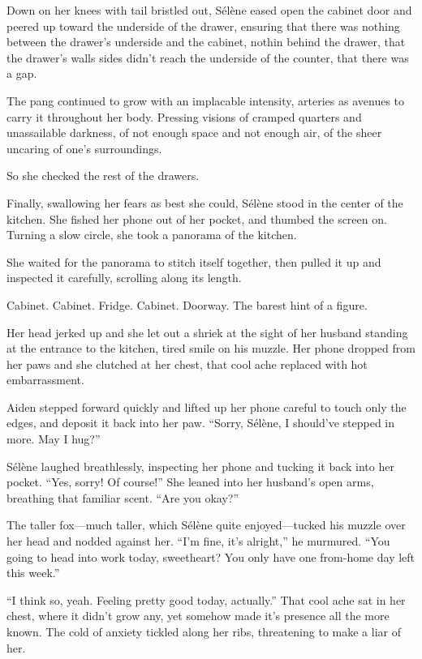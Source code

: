 Down on her knees with tail bristled out, Sélène eased open the cabinet door and peered up toward the underside of the drawer, ensuring that there was nothing between the drawer's underside and the cabinet, nothin behind the drawer, that the drawer's walls sides didn't reach the underside of the counter, that there was a gap.

The pang continued to grow with an implacable intensity, arteries as avenues to carry it throughout her body. Pressing visions of cramped quarters and unassailable darkness, of not enough space and not enough air, of the sheer uncaring of one's surroundings.

So she checked the rest of the drawers.

Finally, swallowing her fears as best she could, Sélène stood in the center of the kitchen. She fished her phone out of her pocket, and thumbed the screen on. Turning a slow circle, she took a panorama of the kitchen.

She waited for the panorama to stitch itself together, then pulled it up and inspected it carefully, scrolling along its length.

Cabinet. Cabinet. Fridge. Cabinet. Doorway. The barest hint of a figure.

Her head jerked up and she let out a shriek at the sight of her husband standing at the entrance to the kitchen, tired smile on his muzzle. Her phone dropped from her paws and she clutched at her chest, that cool ache replaced with hot embarrassment.

Aiden stepped forward quickly and lifted up her phone careful to touch only the edges, and deposit it back into her paw. ``Sorry, Sélène, I should've stepped in more. May I hug?''

Sélène laughed breathlessly, inspecting her phone and tucking it back into her pocket. ``Yes, sorry! Of course!'' She leaned into her husband's open arms, breathing that familiar scent. ``Are you okay?''

The taller fox---much taller, which Sélène quite enjoyed---tucked his muzzle over her head and nodded against her. ``I'm fine, it's alright,'' he murmured. ``You going to head into work today, sweetheart? You only have one from-home day left this week.''

``I think so, yeah. Feeling pretty good today, actually.'' That cool ache sat in her chest, where it didn't grow any, yet somehow made it's presence all the more known. The cold of anxiety tickled along her ribs, threatening to make a liar of her.

